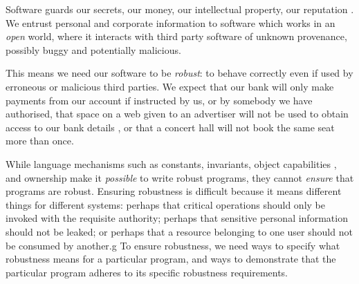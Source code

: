 Software guards our secrets, our money, our intellectual property,
our reputation \cite{covern}.  We entrust personal and
corporate information to software which works in an \emph{open} world, 
where  it interacts with 
third party software of unknown provenance, possibly buggy and potentially malicious.

This means we need our software to be \emph{robust}:
to behave correctly even if  used 
by erroneous or malicious third parties.
We expect that our bank will only make payments 
from our account if instructed by us, or by somebody we have authorised, 
that space on a web given to an advertiser will not be used
to obtain access to our bank details \cite{cwe}, or that a
concert hall will not book the same seat more than once.



While language mechanisms such as constants, invariants, 
object capabilities \cite{MillerPhD}, and 
ownership \cite{ownalias} 
make it \textit{possible} to write robust
programs, they cannot \textit{ensure} that programs are robust.
Ensuring robustness is difficult because it means 
different things for different systems: perhaps
that critical operations should only be invoked with the requisite authority;
perhaps that sensitive personal information should not be leaked; 
or perhaps that a resource belonging to one user should not be consumed by another.g
%
To ensure robustness, we need ways to specify what robustness means for a 
particular program, and ways to demonstrate that the particular program 
adheres to its specific robustness requirements.

